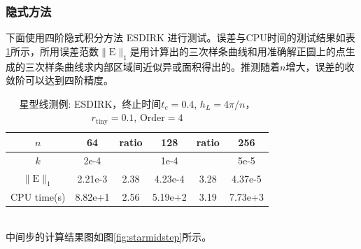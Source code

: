 \documentclass[a4paper,twoside]{ctexart}
\begin{document}
\subsubsection{隐式方法}
下面使用四阶隐式积分方法 ESDIRK 进行测试。误差与CPU时间的测试结果如表\ref{tab:star2}所示，所用误差范数$\|\mathrm{E}\|_1$是用计算出的三次样条曲线和用准确解正圆上的点生成的三次样条曲线求内部区域间近似异或面积得出的。推测随着$n$增大，误差的收敛阶可以达到四阶精度。
\begin{table}[htbp]
    \centering\begin{tabular}{c|ccccc}
        \hline
         $n$&64&ratio&128&ratio&256\\
                \hline
         $k$&2e-4&&1e-4&&5e-5\\
        \hline
        $\|\mathrm{E}\|_1$&2.21e-3&2.38&4.23e-4&3.28&4.37e-5\\
        \hline
        CPU time(s)&8.82e+1&2.56&5.19e+2&3.19&7.73e+3\\
        \hline
      \end{tabular}
    \caption{星型线测例: ESDIRK，终止时间$t_e = 0.4$, $h_L=4\pi/n$，$r_{\text{tiny}}=0.1$,
      $\text{Order} = 4$}
    \label{tab:star2}
  \end{table}\\  
中间步的计算结果图如图\ref{fig:starmidstep}所示。
\newpage
\end{document}
